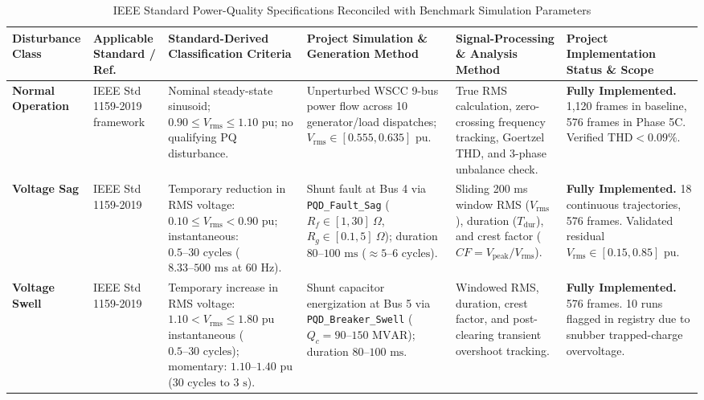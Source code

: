 \documentclass[12pt,a4paper]{report}
\begin{document}
\begin{table}[H]
\centering
\caption{IEEE Standard Power-Quality Specifications Reconciled with Benchmark Simulation Parameters}
\label{tab:classification_matrix}
\tiny
\setlength{\tabcolsep}{3pt}
\renewcommand{\arraystretch}{1.2}
\begin{tabularx}{\textwidth}{p{1.7cm}p{1.6cm}p{2.5cm}p{2.7cm}p{2.7cm}p{2.4cm}}
\toprule
\textbf{Disturbance Class} & \textbf{Applicable Standard / Ref.} & \textbf{Standard-Derived Classification Criteria} & \textbf{Project Simulation \& Generation Method} & \textbf{Signal-Processing \& Analysis Method} & \textbf{Project Implementation Status \& Scope} \\
\midrule
\textbf{Normal Operation} & IEEE Std 1159-2019 framework & Nominal steady-state sinusoid; $0.90 \le V_{\text{rms}} \le 1.10\text{ pu}$; no qualifying PQ disturbance. & Unperturbed WSCC 9-bus power flow across 10 generator/load dispatches; $V_{\text{rms}} \in [0.555, 0.635]\text{ pu}$. & True RMS calculation, zero-crossing frequency tracking, Goertzel THD, and 3-phase unbalance check. & \textbf{Fully Implemented.} 1,120 frames in baseline, 576 frames in Phase 5C. Verified $\text{THD} < 0.09\%$. \\
\addlinespace
\textbf{Voltage Sag} & IEEE Std 1159-2019 & Temporary reduction in RMS voltage: $0.10 \le V_{\text{rms}} < 0.90\text{ pu}$; instantaneous: $0.5\text{--}30\text{ cycles}$ ($8.33\text{--}500\text{ ms}$ at 60 Hz). & Shunt fault at Bus 4 via \texttt{PQD\_Fault\_Sag} ($R_f \in [1, 30]\ \Omega$, $R_g \in [0.1, 5]\ \Omega$); duration $80\text{--}100\text{ ms}$ ($\approx 5\text{--}6\text{ cycles}$). & Sliding 200 ms window RMS ($V_{\text{rms}}$), duration ($T_{\text{dur}}$), and crest factor ($CF = V_{\text{peak}} / V_{\text{rms}}$). & \textbf{Fully Implemented.} 18 continuous trajectories, 576 frames. Validated residual $V_{\text{rms}} \in [0.15, 0.85]\text{ pu}$. \\
\addlinespace
\textbf{Voltage Swell} & IEEE Std 1159-2019 & Temporary increase in RMS voltage: $1.10 < V_{\text{rms}} \le 1.80\text{ pu}$ instantaneous ($0.5\text{--}30\text{ cycles}$); momentary: $1.10\text{--}1.40\text{ pu}$ ($30\text{ cycles to }3\text{ s}$). & Shunt capacitor energization at Bus 5 via \texttt{PQD\_Breaker\_Swell} ($Q_c = 90\text{--}150\text{ MVAR}$); duration $80\text{--}100\text{ ms}$. & Windowed RMS, duration, crest factor, and post-clearing transient overshoot tracking. & \textbf{Fully Implemented.} 576 frames. 10 runs flagged in registry due to snubber trapped-charge overvoltage. \\

\end{tabularx}
\end{table}
\end{document}
